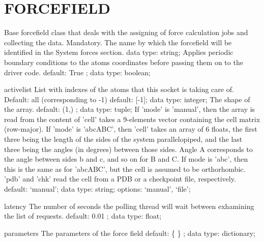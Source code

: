 \section{FORCEFIELD}
\label{FORCEFIELD}
\begin{ipifield}{}%
{Base forcefield class that deals with the assigning of force calculation jobs and collecting the data.}%
{}%
{%
{Mandatory. The name by which the forcefield will be identified in the System forces section.}%
{data type: string; }%
%
{Applies periodic boundary conditions to the atoms coordinates before passing them on to the driver code.}%
{default:  True ; data type: boolean; }%
}
\begin{ipifield}{activelist}%
{List with indexes of the atoms that this socket is taking care of.    Default: all (corresponding to -1)}%
{default: 
      [-1]; data type: integer; }%
{%
{The shape of the array.}%
{default:  (1,) ; data type: tuple; }%
%
{If 'mode' is 'manual', then the array is read from the content of 'cell' takes a 9-elements vector containing the cell matrix (row-major). If 'mode' is 'abcABC', then 'cell' takes an array of 6 floats, the first three being the length of the sides of the system parallelopiped, and the last three being the angles (in degrees) between those sides. Angle A corresponds to the angle between sides b and c, and so on for B and C. If mode is 'abc', then this is the same as for 'abcABC', but the cell is assumed to be orthorhombic. 'pdb' and 'chk' read the cell from a PDB or a checkpoint file, respectively.}%
{default: `manual'; data type: string; options: `manual', `file'; }%
}
\end{ipifield}
\begin{ipifield}{latency}%
{The number of seconds the polling thread will wait between exhamining the list of requests.}%
{default:  0.01 ; data type: float; }%
{}
\end{ipifield}
\begin{ipifield}{parameters}%
{The parameters of the force field}%
{default:  \{ \} ; data type: dictionary; }%
{}
\end{ipifield}
\end{ipifield}
